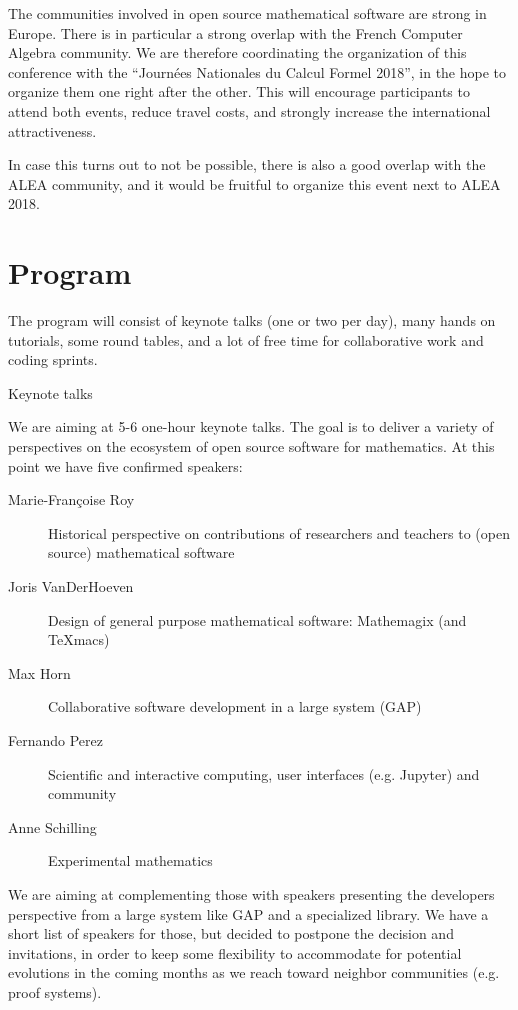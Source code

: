 \documentclass[12pt]{amsart}
\makeatletter
\def\subsection{\@startsection{subsection}{2}%
  \z@{.3\linespacing\@plus.5\linespacing}{.1\linespacing}%
  {\normalfont\bfseries}}
\makeatother
\begin{document}
The communities involved in open source mathematical software are
strong in Europe. There is in particular a strong overlap with the
French Computer Algebra community. We are therefore coordinating the
organization of this conference with the ``Journées Nationales du
Calcul Formel 2018'', in the hope to organize them one right after the
other. This will encourage participants to attend both events, reduce
travel costs, and strongly increase the international attractiveness.

In case this turns out to not be possible, there is also a good
overlap with the ALEA community, and it would be fruitful to organize
this event next to ALEA 2018.

\section{Program}

The program will consist of keynote talks (one or two per day), many
hands on tutorials, some round tables, and a lot of free time for
collaborative work and coding sprints.

\subsection{Keynote talks}

We are aiming at 5-6 one-hour keynote talks. The goal is to deliver a
variety of perspectives on the ecosystem of open source software for
mathematics. At this point we have five confirmed speakers:

\begin{description}
\item[Marie-Françoise Roy] Historical perspective on contributions of
  researchers and teachers to (open source) mathematical software
\item[Joris VanDerHoeven] Design of general purpose mathematical software: Mathemagix (and TeXmacs)
\item[Max Horn] Collaborative software development in a large system (GAP)
\item[Fernando Perez] Scientific and interactive computing, user
  interfaces (e.g. Jupyter) and community
\item[Anne Schilling] Experimental mathematics
\end{description}

We are aiming at complementing those with speakers presenting the
developers perspective from a large system like GAP and a specialized
library. We have a short list of speakers for those, but decided to
postpone the decision and invitations, in order to keep some
flexibility to accommodate for potential evolutions in the coming
months as we reach toward neighbor communities (e.g. proof systems).
\end{document}
